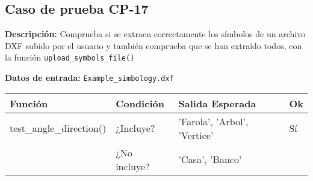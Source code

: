 \subsection{Caso de prueba CP-17}

\textbf{Descripción:} Comprueba si se extraen correctamente los símbolos de un archivo DXF subido por el usuario y también comprueba que se han extraído todos, con la función  \texttt{upload\_symbols\_file()}

\textbf{Datos de entrada:} \texttt{Example\_simbology.dxf}


\begin{longtable}[]{@{}llll@{}}
\toprule
\begin{minipage}[b]{0.6\columnwidth}\raggedright\strut
Función\strut
\end{minipage} & \begin{minipage}[b]{0.20\columnwidth}\raggedright\strut
Condición\strut
\end{minipage} & \begin{minipage}[b]{0.15\columnwidth}\raggedright\strut
Salida Esperada\strut
\end{minipage} & \begin{minipage}[b]{0.05\columnwidth}\raggedright\strut
Ok\strut
\end{minipage}\tabularnewline
\midrule
\endhead
\begin{minipage}[t]{0.6\columnwidth}\raggedright\strut
\small{test\_angle\_direction()}\strut
\end{minipage} & \begin{minipage}[t]{0.20\columnwidth}\raggedright\strut
¿Incluye?\strut
\end{minipage} & \begin{minipage}[t]{0.15\columnwidth}\raggedright\strut
'Farola', 'Arbol', 'Vertice'\strut
\end{minipage} & \begin{minipage}[t]{0.05\columnwidth}\raggedright\strut
Sí\strut
\end{minipage}\tabularnewline
\begin{minipage}[t]{0.5\columnwidth}\raggedright\strut
\strut
\end{minipage} & \begin{minipage}[t]{0.20\columnwidth}\raggedright\strut
¿No incluye?\strut
\end{minipage} & \begin{minipage}[t]{0.15\columnwidth}\raggedright\strut
'Casa', 'Banco'\strut
\end{minipage} & \begin{minipage}[t]{0.05\columnwidth}\raggedright\strut

\end{minipage}
\end{longtable}

